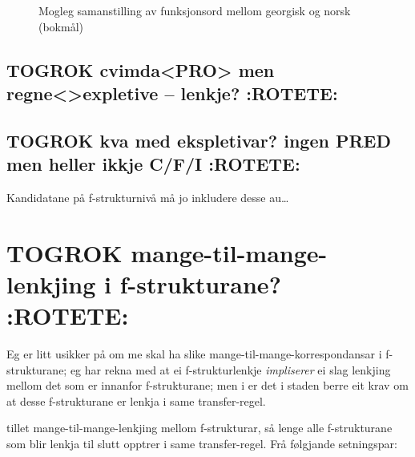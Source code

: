 \documentclass[11pt,a4paper,oneside,draft]{book}
\begin{document}
  \begin{figure}[htp]
   \vfill{} %
  
  \caption{Mogleg samanstilling av funksjonsord mellom georgisk og norsk (bokmål)}
   \label{fig:fnord}
  \end{figure}

\subsection{\textbf{TOGROK} cvimda<PRO> men regne<>expletive -- lenkje? \textbf{:ROTETE:}}
\label{sec-3.7.1}

\subsection{\textbf{TOGROK} kva med ekspletivar? ingen PRED men heller ikkje C/F/I \textbf{:ROTETE:}}
\label{sec-3.7.2}

Kandidatane på f-strukturnivå må jo inkludere desse au\ldots{}

\section{\textbf{TOGROK} mange-til-mange-lenkjing i f-strukturane? \textbf{:ROTETE:}}
\label{sec-3.8}

    Eg er litt usikker på om me skal ha slike
    mange-til-mange-korrespondansar i f-strukturane; eg har rekna med
    at ei f-strukturlenkje \emph{impliserer} ei slag lenkjing mellom det som
    er innanfor f-strukturane; men i \citet{riezler2006gmt} er det i
    staden berre eit krav om at desse f-strukturane er lenkja i same
    transfer-regel.


\citet[s.~40--41]{riezler2006gmt} tillet mange-til-mange-lenkjing
mellom f-strukturar, så lenge alle f-strukturane som blir lenkja til
slutt opptrer i same transfer-regel. Frå følgjande setningspar:
\end{document}
